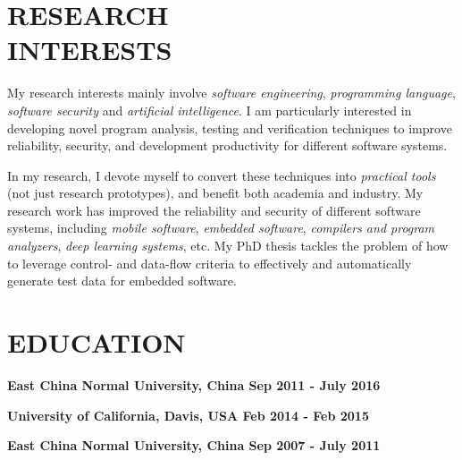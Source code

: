 \documentclass[margin]{res}
\begin{document}
\begin{resume}

\section{RESEARCH\\INTERESTS}
{My research interests mainly involve \emph{software engineering}, \emph{programming language}, \emph{software security} and \emph{artificial intelligence}. I am particularly interested in developing novel program analysis, testing and verification techniques to improve reliability, security, and development productivity for different software systems.

In my research, I devote myself to convert these techniques into \emph{practical tools} (not just research prototypes), and benefit both academia and industry.
My research work has improved the reliability and security of different software systems, including \emph{mobile software}, \emph{embedded software}, \emph{compilers and program analyzers}, \emph{deep learning systems}, etc. 
My PhD thesis tackles the problem of how to leverage control- and data-flow criteria to effectively and automatically generate test data for embedded software.}

\section{EDUCATION}
\textbf{East China Normal University, China \hfill{Sep 2011 - July 2016}\\}

\textbf{University of California, Davis, USA \hfill{Feb 2014 - Feb 2015}\\}

\textbf{East China Normal University, China \hfill{Sep 2007 - July 2011}\\}


\end{resume}
\end{document}
